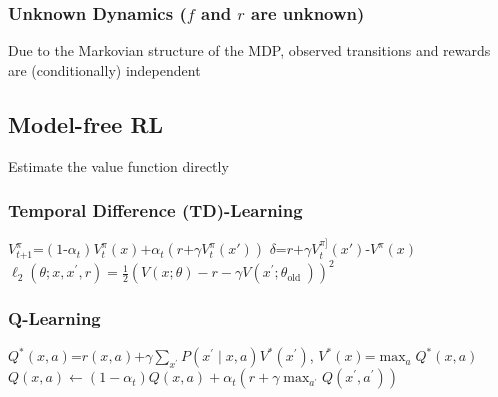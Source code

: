 \documentclass[a4paper, 11pt, landscape]{article}
\begin{document}
\begin{multicols*}{3}
\subsubsection{Unknown Dynamics ($f$ and $r$ are unknown)}
Due to the Markovian structure of the MDP, observed transitions and rewards are (conditionally) independent

\subsection{Model-free RL}
Estimate the value function directly

\subsubsection{Temporal Difference (TD)-Learning}
$V^{\pi}_{t\text{+}1} \text{=} (1\text{-}\alpha_t)V^{\pi}_t(x)\text{+}\alpha_t(r\text{+}\gamma V^{\pi}_t(x'))$
\space\space\space\space\space\space $\delta \text{=} r\text{+}\gamma V^{\pi]}_{t}(x')\text{-}V^{\pi}(x)$
\newline $\ell_{2}\left(\theta ; x, x^{\prime}, r\right)=\frac{1}{2}\left(V(x ; \theta)-r-\gamma V\left(x^{\prime} ; \theta_{\text {old }}\right)\right)^{2}$

\subsubsection{Q-Learning}
$Q^{*}(x, a)\text{=}r(x, a)\text{+}\gamma \sum_{x^{\prime}} P\left(x^{\prime} \mid x, a\right) V^{*}\left(x^{\prime}\right)$, $V^{*}(x)\text{=}\max _{a} Q^{*}(x, a)$
\newline $Q(x, a) \leftarrow\left(1-\alpha_{t}\right) Q(x, a)+\alpha_{t}\left(r+\gamma \max _{a^{\prime}} Q\left(x^{\prime}, a^{\prime}\right)\right)$


\end{multicols*}
\end{document}
